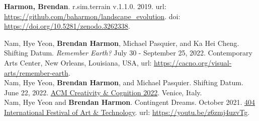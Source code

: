 \documentclass[10pt]{developercv} %
\begin{document}
\clearpage


\nocite{*}
\setlength\bibitemsep{0.75em}

\printbibliography[title={\cvsect{Books}}, type=book, heading=subbibliography]

\printbibliography[title={\cvsect{Papers}}, keyword=peer_reviewed, heading=subbibliography]

\printbibliography[title={\cvsect{Chapters}}, type=incollection, heading=subbibliography]

\clearpage
\printbibliography[title={\cvsect{Select presentations}}, type=unpublished, heading=subbibliography]

\clearpage
\printbibliography[title={\cvsect{Reports}}, type=report, heading=subbibliography]



\textbf{Harmon, Brendan}. r.sim.terrain v.1.1.0. 2019. url: \url{https://github.com/baharmon/landscape_evolution}. doi: \url{https://doi.org/10.5281/zenodo.3262338}.



Nam, Hye Yeon, \textbf{Brendan Harmon}, Michael Pasquier, and Ka Hei Cheng. Shifting Datum. \emph{Remember Earth?} July 30 - September 25, 2022. Contemporary Arts Center, New Orleans, Louisiana, USA, url: \url{https://cacno.org/visual-arts/remember-earth}.\\

Nam, Hye Yeon, \textbf{Brendan Harmon}, and Michael Pasquier. Shifting Datum. June 22, 2022. \href{https://cc.acm.org/2022/}{ACM Creativity \& Cognition 2022}. Venice, Italy.\\

Nam, Hye Yeon and \textbf{Brendan Harmon}. Contingent Dreams. October 2021. \href{https://www.404festival.com}{404 International Festival of Art \& Technology}. url: \url{https://youtu.be/z6zmj4uzvTg}.\\
\end{document}
